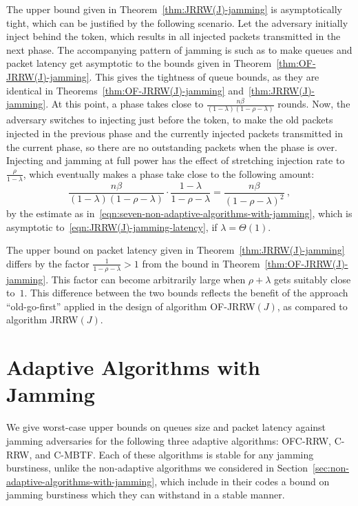 \documentclass[11pt]{article}
\begin{document}
The upper bound given in Theorem~\ref{thm:JRRW(J)-jamming} is asymptotically tight, which can be justified by the following scenario.
Let the adversary initially inject behind the token, which results in all injected packets transmitted in the next phase.
The accompanying pattern of jamming is such as to make queues and packet latency get asymptotic to the bounds given in Theorem~\ref{thm:OF-JRRW(J)-jamming}.
This gives the tightness of queue bounds, as they are identical in Theorems~\ref{thm:OF-JRRW(J)-jamming} and~\ref{thm:JRRW(J)-jamming}.
At this point, a phase takes close to $\frac{n\beta}{(1-\lambda)(1-\rho-\lambda)}$ rounds.
Now, the adversary switches to injecting just before the token, to make the old packets injected in the previous phase and the currently injected packets transmitted in the current phase, so there are no outstanding packets when the phase is over.
Injecting and jamming at full power has the effect of stretching injection rate to $\frac{\rho}{1-\lambda}$, which eventually makes a phase take close to the following amount: 
\[
\frac{n\beta}{(1-\lambda)(1-\rho-\lambda)} \cdot \frac{1-\lambda}{1-\rho-\lambda}
=
\frac{n\beta}{(1-\rho-\lambda)^2}
\ ,
\]
by the estimate as in~\eqref{eqn:seven-non-adaptive-algorithms-with-jamming}, which is asymptotic to~\eqref{eqn:JRRW(J)-jamming-latency}, if $\lambda=\Theta(1)$.

The upper bound on packet latency given in Theorem~\ref{thm:JRRW(J)-jamming} differs by the factor $\frac{1}{1-\rho-\lambda}>1$ from the bound in Theorem~\ref{thm:OF-JRRW(J)-jamming}.
This factor can become arbitrarily large when $\rho+\lambda$ gets suitably close to~$1$. 
This difference between the two bounds reflects the benefit of the approach ``old-go-first'' applied in the design of algorithm \textsc{OF-JRRW$(J)$}, as compared to algorithm \textsc{JRRW$(J)$}.







\section{Adaptive Algorithms with Jamming}

\label{sec:adaptive-algorithms-with-jamming}



We give worst-case upper bounds on queues size and packet latency against jamming adversaries for the following three adaptive algorithms: \textsc{OFC-RRW}, \textsc{C-RRW}, and \textsc{C-MBTF}.
Each of these algorithms is stable for any jamming burstiness, unlike the non-adaptive algorithms we considered in Section~\ref{sec:non-adaptive-algorithms-with-jamming}, which include in their codes a bound on jamming burstiness which they can withstand in a stable manner.
\end{document}
